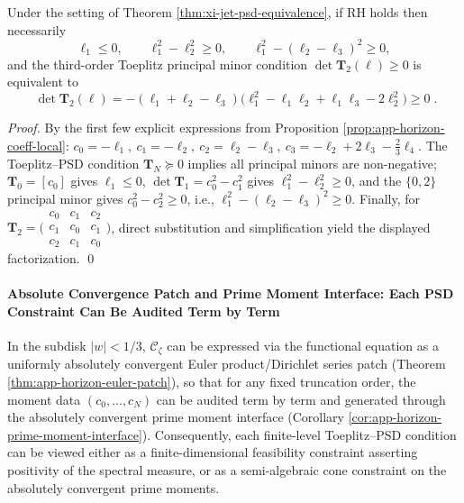 \begin{corollary}\label{cor:xi-jet-low-order-inequalities}
Under the setting of Theorem \ref{thm:xi-jet-psd-equivalence}, if RH holds then necessarily
\[
\ell_1\le 0,\qquad
\ell_1^{2}-\ell_2^{2}\ge 0,\qquad
\ell_1^{2}-(\ell_2-\ell_3)^{2}\ge 0,
\]
and the third-order Toeplitz principal minor condition \(\det\mathbf{T}_2(\ell)\ge 0\) is equivalent to
\[
\boxed{\;
\det\mathbf{T}_2(\ell)
=-(\ell_1+\ell_2-\ell_3)\bigl(\ell_1^2-\ell_1\ell_2+\ell_1\ell_3-2\ell_2^2\bigr)\ge 0\; }.
\]
\end{corollary}

\begin{proof}
By the first few explicit expressions from Proposition \ref{prop:app-horizon-coeff-local}:
\(
c_0=-\ell_1,\ c_1=-\ell_2,\ c_2=\ell_2-\ell_3,\ c_3=-\ell_2+2\ell_3-\tfrac23\ell_4
\).
The Toeplitz--PSD condition \(\mathbf{T}_N\succeq 0\) implies all principal minors are non-negative;
\(\mathbf{T}_0=[c_0]\) gives \(\ell_1\le 0\), \(\det\mathbf{T}_1=c_0^2-c_1^2\) gives \(\ell_1^2-\ell_2^2\ge 0\), and the \(\{0,2\}\) principal minor gives \(c_0^2-c_2^2\ge 0\), i.e., \(\ell_1^2-(\ell_2-\ell_3)^2\ge 0\).
Finally, for \(\mathbf{T}_2=\bigl(\begin{smallmatrix}c_0&c_1&c_2\\ c_1&c_0&c_1\\ c_2&c_1&c_0\end{smallmatrix}\bigr)\), direct substitution and simplification yield the displayed factorization. \qed
\end{proof}

\paragraph{Absolute Convergence Patch and Prime Moment Interface: Each PSD Constraint Can Be Audited Term by Term}
In the subdisk \(|w|<1/3\), \(\mathscr{C}_{\zeta}\) can be expressed via the functional equation as a uniformly absolutely convergent Euler product/Dirichlet series patch (Theorem \ref{thm:app-horizon-euler-patch}), so that for any fixed truncation order, the moment data \((c_0,\dots,c_N)\) can be audited term by term and generated through the absolutely convergent prime moment interface (Corollary \ref{cor:app-horizon-prime-moment-interface}).
Consequently, each finite-level Toeplitz--PSD condition can be viewed either as a finite-dimensional feasibility constraint asserting positivity of the spectral measure, or as a semi-algebraic cone constraint on the absolutely convergent prime moments.

